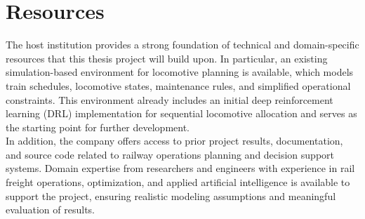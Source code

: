 \documentclass[a4paper]{scrartcl}
\begin{document}
\section{Resources}
The host institution provides a strong foundation of technical and domain-specific resources that this thesis project will build upon. In particular, an existing simulation-based environment for locomotive planning is available, which models train schedules, locomotive states, maintenance rules, and simplified operational constraints. This environment already includes an initial deep reinforcement learning (DRL) implementation for sequential locomotive allocation and serves as the starting point for further development.\\
In addition, the company offers access to prior project results, documentation, and source code related to railway operations planning and decision support systems. Domain expertise from researchers and engineers with experience in rail freight operations, optimization, and applied artificial intelligence is available to support the project, ensuring realistic modeling assumptions and meaningful evaluation of results.
\end{document}
